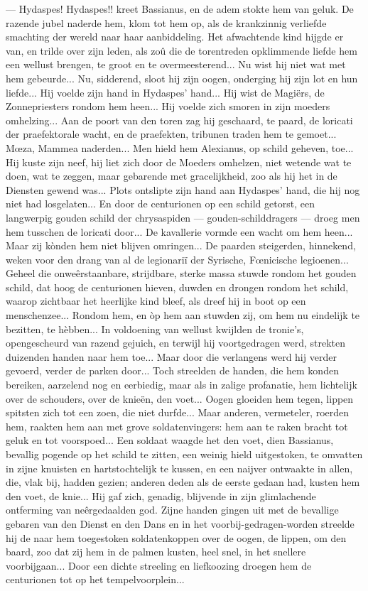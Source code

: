 \documentclass[a4paper, 12pt, oneside, dutch]{article}
\begin{document}
--- Hydaspes! Hydaspes!! kreet Bassianus, en de adem stokte hem van geluk. De razende jubel naderde hem, klom tot hem op, als de krankzinnig verliefde smachting der wereld naar haar aanbiddeling. Het afwachtende kind hijgde er van, en trilde over zijn leden, als zoû die de torentreden opklimmende liefde hem een wellust brengen, te groot en te overmeesterend... Nu wist hij niet wat met hem gebeurde... Nu, sidderend, sloot hij zijn oogen, onderging hij zijn lot en hun liefde... Hij voelde zijn hand in Hydaspes' hand... Hij wist de Magiërs, de Zonnepriesters rondom hem heen... Hij voelde zich smoren in zijn moeders omhelzing... Aan de poort van den toren zag hij geschaard, te paard, de loricati der praefektorale wacht, en de praefekten, tribunen traden hem te gemoet... Mœza, Mammea naderden... Men hield hem Alexianus, op schild geheven, toe... Hij kuste zijn neef, hij liet zich door de Moeders omhelzen, niet wetende wat te doen, wat te zeggen, maar gebarende met gracelijkheid, zoo als hij het in de Diensten gewend was... Plots ontslipte zijn hand aan Hydaspes' hand, die hij nog niet had losgelaten... En door de centurionen op een schild getorst, een langwerpig gouden schild der chrysaspiden --- gouden-schilddragers --- droeg men hem tusschen de loricati door... De kavallerie vormde een wacht om hem heen... Maar zij kònden hem niet blijven omringen... De paarden steigerden, hinnekend, weken voor den drang van al de legionariï der Syrische, Fœnicische legioenen... Geheel die onweêrstaanbare, strijdbare, sterke massa stuwde rondom het gouden schild, dat hoog de centurionen hieven, duwden en drongen rondom het schild, waarop zichtbaar het heerlijke kind bleef, als dreef hij in boot op een menschenzee... Rondom hem, en òp hem aan stuwden zij, om hem nu eindelijk te bezitten, te hèbben... In voldoening van wellust kwijlden de tronie's, opengescheurd van razend gejuich, en terwijl hij voortgedragen werd, strekten duizenden handen naar hem toe... Maar door die verlangens werd hij verder gevoerd, verder de parken door... Toch streelden de handen, die hem konden bereiken, aarzelend nog en eerbiedig, maar als in zalige profanatie, hem lichtelijk over de schouders, over de knieën, den voet... Oogen gloeiden hem tegen, lippen spitsten zich tot een zoen, die niet durfde... Maar anderen, vermeteler, roerden hem, raakten hem aan met grove soldatenvingers: hem aan te raken bracht tot geluk en tot voorspoed... Een soldaat waagde het den voet, dien Bassianus, bevallig pogende op het schild te zitten, een weinig hield uitgestoken, te omvatten in zijne knuisten en hartstochtelijk te kussen, en een naijver ontwaakte in allen, die, vlak bij, hadden gezien; anderen deden als de eerste gedaan had, kusten hem den voet, de knie... Hij gaf zich, genadig, blijvende in zijn glimlachende ontferming van neêrgedaalden god. Zijne handen gingen uit met de bevallige gebaren van den Dienst en den Dans en in het voorbij-gedragen-worden streelde hij de naar hem toegestoken soldatenkoppen over de oogen, de lippen, om den baard, zoo dat zij hem in de palmen kusten, heel snel, in het snellere voorbijgaan... Door een dichte streeling en liefkoozing droegen hem de centurionen tot op het tempelvoorplein...
\end{document}
